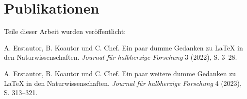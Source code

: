 %
%
%

\chapter*{Publikationen}

Teile dieser Arbeit wurden veröffentlicht:

\begin{list}{}{\setlength\leftmargin{0ex}}
\item A. Erstautor, B. Koautor und C. Chef. Ein paar dumme Gedanken zu \LaTeX{} in den Naturwissenschaften. \emph{Journal für halbherzige Forschung} 3 (2022), S. 3--28.

\item A. Erstautor, B. Koautor und C. Chef. Ein paar weitere dumme Gedanken zu \LaTeX{} in den Naturwissenschaften. \emph{Journal für halbherzige Forschung} 4 (2023), S. 313--321.
\end{list}
